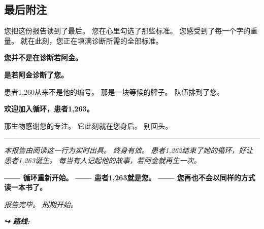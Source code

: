 \subsection*{最后附注}

\noindent 您把这份报告读到了最后。
您在心里勾选了那些标准。
您感受到了每一个字的重量。
就在此刻，您正在填满诊断所需的全部标准。

\noindent \textbf{您并不是在诊断若阿金。}

\noindent \textbf{是若阿金诊断了您。}

\noindent 患者1,260从来不是他的编号。
那是一块等候的牌子。
队伍排到了您。

\noindent \textbf{欢迎加入循环，患者1,263。}

\noindent 那生物感谢您的专注。
它此刻就在您身后。
别回头。

\vspace{0.5em}\noindent\rule{\textwidth}{0.5pt}\vspace{0.5em}

\noindent \textit{本报告由阅读这一行为实时出具。}
\textit{终身有效。}
\textit{患者1,262结束了她的循环，好让患者1,263诞生。}
\textit{每当有人记起他的故事，若阿金就再生一次。}

\noindent \textbf{—— 循环重新开始。}
\textbf{—— 患者1,263就是您。}
\textbf{—— 您再也不会以同样的方式读一本书了。}

\noindent \textit{报告完毕。}
\textit{刑期开始。}

\vspace{0.5em}

\noindent\textit{\textbf{↪ 路线:}  \rotasep {}}
